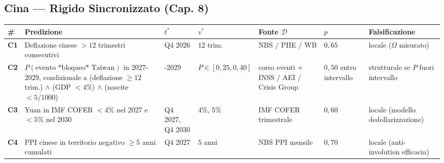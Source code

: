 \subsection{Cina --- Rigido Sincronizzato (Cap.
8)}\label{cina-rigido-sincronizzato-cap.-8}

{\def\LTcaptype{none} %
{\small\begin{longtable}[]{@{}
  >{\raggedright\arraybackslash}p{}
  >{\raggedright\arraybackslash}p{}
  >{\raggedright\arraybackslash}p{}
  >{\raggedright\arraybackslash}p{}
  >{\raggedright\arraybackslash}p{}
  >{\raggedright\arraybackslash}p{}
  >{\raggedright\arraybackslash}p{}@{}}
\toprule\noalign{}
\begin{minipage}[b]{\linewidth}\raggedright
\#
\end{minipage} & \begin{minipage}[b]{\linewidth}\raggedright
Predizione
\end{minipage} & \begin{minipage}[b]{\linewidth}\raggedright
\(t^*\)
\end{minipage} & \begin{minipage}[b]{\linewidth}\raggedright
\(v^*\)
\end{minipage} & \begin{minipage}[b]{\linewidth}\raggedright
Fonte \(\mathcal{D}\)
\end{minipage} & \begin{minipage}[b]{\linewidth}\raggedright
\(p\)
\end{minipage} & \begin{minipage}[b]{\linewidth}\raggedright
Falsificazione
\end{minipage} \\
\midrule\noalign{}
\endhead
\bottomrule\noalign{}
\endlastfoot
\textbf{C1} & Deflazione cinese \(> 12\) trimestri consecutivi & Q4 2026
& \(12\) trim. & NBS / PIIE / WB & \(0{,}65\) & locale (\(\Omega\)
misurato) \\
\textbf{C2} & \(P(\text{evento *bloqueo* Taiwan})\) in 2027-2029,
condizionale a (deflazione \(\geq 12\) trim.) \(\wedge\) (GDP \(< 4\%\))
\(\wedge\) (nascite \(< 5/1000\)) & 2027-2029 &
\(P \in [0{,}25, 0{,}40]\) & corso eventi + INSS / AEI / Crisis Group &
\(0{,}50\) entro intervallo & strutturale se \(P\) fuori intervallo \\
\textbf{C3} & Yuan in IMF COFER \(< 4\%\) nel 2027 e \(< 5\%\) nel 2030
& Q4 2027, Q4 2030 & \(4\%\), \(5\%\) & IMF COFER trimestrale &
\(0{,}60\) & locale (modello dedollarizzazione) \\
\textbf{C4} & PPI cinese in territorio negativo \(\geq 5\) anni cumulati
& Q4 2027 & \(5\) anni & NBS PPI mensile & \(0{,}70\) & locale
(anti-involution efficacia) \\
\end{longtable}}
}

